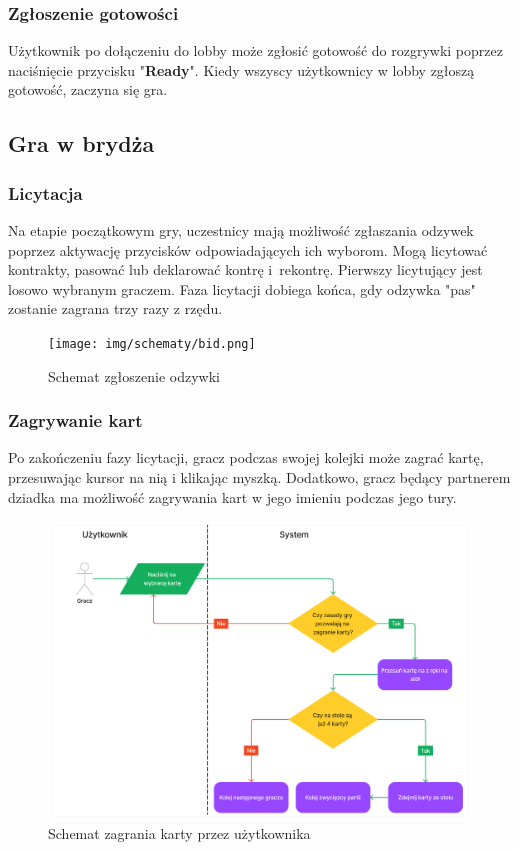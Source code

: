 \subsubsection{Zgłoszenie gotowości}
Użytkownik po dołączeniu do lobby może zgłosić gotowość do rozgrywki poprzez 
naciśnięcie przycisku "\textbf{Ready}". Kiedy wszyscy użytkownicy w lobby zgłoszą
gotowość, zaczyna się gra.

\subsection{Gra w brydża}

\subsubsection{Licytacja}
Na etapie początkowym gry, uczestnicy mają możliwość zgłaszania odzywek poprzez 
aktywację przycisków odpowiadających ich wyborom. Mogą licytować kontrakty, pasować lub
deklarować kontrę i~rekontrę. Pierwszy licytujący jest losowo 
wybranym graczem. Faza licytacji dobiega końca, gdy odzywka "pas" zostanie zagrana 
trzy razy z rzędu.

\begin{figure}[h]
  \centering
  \texttt{[image: img/schematy/bid.png]}
  \caption{Schemat zgłoszenie odzywki}
\end{figure}

\FloatBarrier

\subsubsection{Zagrywanie kart}

Po zakończeniu fazy licytacji, gracz podczas swojej kolejki może zagrać kartę, 
przesuwając kursor na nią i klikając myszką. Dodatkowo, gracz będący partnerem dziadka 
ma możliwość zagrywania kart w jego imieniu podczas jego tury.


\begin{figure}[h]
  \centering
  \includegraphics[width=\textwidth]{img/schematy/play_card.png}
  \caption{Schemat zagrania karty przez użytkownika}
\end{figure}

